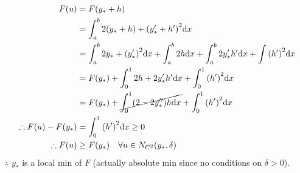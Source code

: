 \documentclass[12pt,twoside]{article}
\begin{document}
\begin{enumerate}
  \begin{equation*}
    \begin{aligned}
      F(u)&=F(y_*+h) \\
      &= \int_a^b 2(y_*+h)+{(y_*'+h')}^2\mathrm{d}{x} \\
      &= \int_a^b 2y_* + {(y_*')}^2\mathrm{d}{x} + \int_a^b 2h\mathrm{d}{x} + \int_a^b 2y_*'h'\mathrm{d}{x} + \int {(h')}^2\mathrm{d}{x} \\
      &= F(y_*) + \int_0^1 2h + 2y_*'h'\mathrm{d}{x} + \int_0^1{(h')}^2\mathrm{d}{x} \\
      &= F(y_*) + \cancel{\int_0^1(2-2y_*'')h\mathrm{d}{x}} + \int_0^1{(h')}^2\mathrm{d}{x} \\
      \therefore F(u) - F(y_*) &= \int_0^1{(h')}^2\mathrm{d}{x} \ge 0 \\
      \therefore F(u) &\ge F(y_*) \quad \forall u\in N_{C^2}(y_*,\delta)
    \end{aligned}
  \end{equation*}
  $\therefore$ $y_*$ is a local min of $F$ (actually absolute min since no
  conditions on $\delta>0$).
\end{enumerate}
\end{document}
